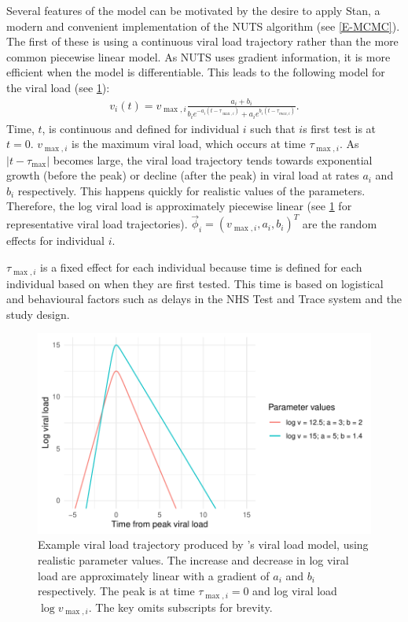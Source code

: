 \documentclass[thesis.tex]{subfiles}
\begin{document}
Several features of the \textcite{hakkiOnset} model can be motivated by the desire to apply Stan, a modern and convenient implementation of the NUTS algorithm (see \cref{E-MCMC}).
The first of these is using a continuous viral load trajectory rather than the more common piecewise linear model.
As NUTS uses gradient information, it is more efficient when the model is differentiable.
This leads to the following model for the viral load (see \cref{ATACCC:fig:viral-load-model}):
\begin{align}
v_i(t) = v_{\max,i} \frac{a_i+b_i}{b_ie^{-a_i(t-\tau_{\max,i})} + a_ie^{b_i(t-\tau_{max,i})}}. \label{ATACCC:eq:viral-load}
\end{align}
Time, $t$, is continuous and defined for individual $i$ such that $i$s first test is at $t = 0$.
$v_{\max,i}$ is the maximum viral load, which occurs at time $\tau_{\max,i}$.
As $\lvert t - \tau_{\max} \rvert$ becomes large, the viral load trajectory tends towards exponential growth (before the peak) or decline (after the peak) in viral load at rates $a_i$ and $b_i$ respectively.
This happens quickly for realistic values of the parameters.
Therefore, the log viral load is approximately piecewise linear (see \cref{ATACCC:fig:viral-load-model} for representative viral load trajectories).
$\vec{\phi}_i = (v_{\max,i}, a_i, b_i)^T$ are the random effects for individual $i$.

$\tau_{\max,i}$ is a fixed effect for each individual because time is defined for each individual based on when they are first tested.
This time is based on logistical and behavioural factors such as delays in the NHS Test and Trace system and the study design.
\begin{figure}[tbhp]
  \centering \includegraphics{ATACCC/typical_trajectory}
  \caption[Example viral load model trajectory.]{%
    Example viral load trajectory produced by \textcite{hakkiOnset}'s viral load model, using realistic parameter values.
    The increase and decrease in log viral load are approximately linear with a gradient of $a_i$ and $b_i$ respectively.
    The peak is at time $\tau_{\max,i} = 0$ and log viral load $\log v_{\max,i}$.
    The key omits subscripts for brevity.
  }
  \label{ATACCC:fig:viral-load-model}
\end{figure}
\end{document}

